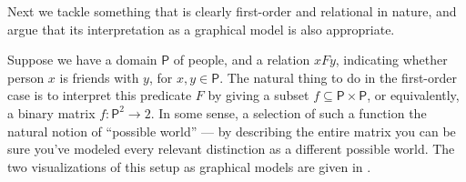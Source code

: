 \documentclass{article}
\newcommand\cmergearr[4]{
		\draw[arr,-] (#1) -- (#4) -- (#2);
		\draw[arr, shorten <=0] (#4) -- (#3);
	}
\newcommand\mergearr[3]{
		\coordinate (center-#1#2#3) at (barycentric cs:#1=1,#2=1,#3=1.2);
		\cmergearr{#1}{#2}{#3}{center-#1#2#3}
	}
\theoremstyle{definition}
\theoremstyle{remark}
\newcommand{\var}[1]{\mathsf{#1}}
\begin{document}
Next we tackle something that is clearly first-order and relational in nature, and argue that its interpretation as a graphical model is also appropriate.

\begin{example}
    Suppose we have a domain $\var P$ of people, and a relation $xFy$, indicating whether person $x$ is friends with $y$, for $x,y\in \var P$. 
    The natural thing to do in the first-order case is to interpret this predicate $F$ by giving a subset $f \subseteq \var P \times \var P$, or equivalently, a binary matrix $f : \var P^2 \to 2$. 
    In some sense, a selection of such a function the natural notion of ``possible world'' --- by describing the entire matrix you can be sure you've modeled every relevant distinction as a different possible world. The two visualizations of this setup as graphical models are given in .
    
    \begin{figure}
        \centering
        \hfill
        \begin{subfigure}[]{0.4\textwidth} \centering
        \end{subfigure}
        \hfill\vline\hfill
        \begin{subfigure}[]{0.4\textwidth}\centering
        \end{subfigure}
        \hfill
        \caption{}
        \label{fig:friendrel}
    \end{figure}



\end{example}
\end{document}
